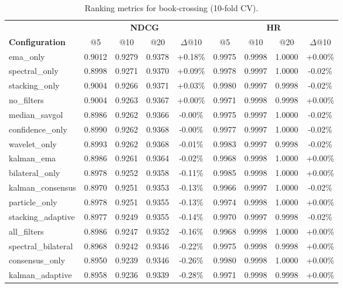 \begin{table}[htbp]
\centering
\caption{Ranking metrics for book-crossing (10-fold CV).}
\label{tab:ranking-book-crossing}
\begin{adjustbox}{max width=\textwidth}
\begin{tabular}{l cccc cccc}
\toprule
& \multicolumn{4}{c}{\textbf{NDCG}} & \multicolumn{4}{c}{\textbf{HR}} \\
\cmidrule(lr){2-5} \cmidrule(lr){6-9}
\textbf{Configuration} & @5 & @10 & @20 & $\Delta$@10 & @5 & @10 & @20 & $\Delta$@10 \\
\midrule
ema\_only & 0.9012 & 0.9279 & 0.9378 & +0.18\% & 0.9975 & 0.9998 & 1.0000 & +0.00\% \\
spectral\_only & 0.8998 & 0.9271 & 0.9370 & +0.09\% & 0.9978 & 0.9997 & 1.0000 & -0.02\% \\
stacking\_only & 0.9004 & 0.9266 & 0.9371 & +0.03\% & 0.9980 & 0.9997 & 0.9998 & -0.02\% \\
no\_filters & 0.9004 & 0.9263 & 0.9367 & +0.00\% & 0.9971 & 0.9998 & 0.9998 & +0.00\% \\
median\_savgol & 0.8986 & 0.9262 & 0.9366 & -0.00\% & 0.9975 & 0.9997 & 1.0000 & -0.02\% \\
confidence\_only & 0.8990 & 0.9262 & 0.9368 & -0.00\% & 0.9977 & 0.9997 & 1.0000 & -0.02\% \\
wavelet\_only & 0.8993 & 0.9262 & 0.9368 & -0.01\% & 0.9983 & 0.9997 & 0.9998 & -0.02\% \\
kalman\_ema & 0.8986 & 0.9261 & 0.9364 & -0.02\% & 0.9968 & 0.9998 & 1.0000 & +0.00\% \\
bilateral\_only & 0.8978 & 0.9252 & 0.9358 & -0.11\% & 0.9985 & 0.9998 & 1.0000 & +0.00\% \\
kalman\_consensus & 0.8970 & 0.9251 & 0.9353 & -0.13\% & 0.9966 & 0.9997 & 1.0000 & -0.02\% \\
particle\_only & 0.8978 & 0.9251 & 0.9355 & -0.13\% & 0.9974 & 0.9998 & 1.0000 & +0.00\% \\
stacking\_adaptive & 0.8977 & 0.9249 & 0.9355 & -0.14\% & 0.9970 & 0.9997 & 0.9998 & -0.02\% \\
all\_filters & 0.8986 & 0.9247 & 0.9352 & -0.16\% & 0.9968 & 0.9998 & 1.0000 & +0.00\% \\
spectral\_bilateral & 0.8968 & 0.9242 & 0.9346 & -0.22\% & 0.9975 & 0.9998 & 0.9998 & +0.00\% \\
consensus\_only & 0.8950 & 0.9239 & 0.9346 & -0.26\% & 0.9980 & 0.9998 & 1.0000 & +0.00\% \\
kalman\_adaptive & 0.8958 & 0.9236 & 0.9339 & -0.28\% & 0.9971 & 0.9998 & 0.9998 & +0.00\% \\

\end{tabular}
\end{adjustbox}
\end{table}
